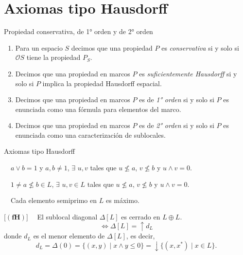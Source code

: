 \documentclass[compress,12pt]{beamer}
\begin{document}
\section{Axiomas tipo Hausdorff}
\begin{frame}{Propiedad conservativa, de 1° orden y de 2° orden}

\begin{definition}
    \begin{enumerate}
        \item Para un espacio $S$ decimos que una propiedad $P$ es \emph{conservativa} si y solo si $\mathcal{O}S$ tiene la propiedad $P_S$.

        \item<2-> Decimos que una propiedad en marcos $P$ es \emph{suficientemente Hausdorff} si y solo si $P$ implica la propiedad Hausdorff espacial.
        
        \item<3-> Decimos que una propiedad en marcos $P$ es de \emph{1° orden} si y solo si $P$ es enunciada como una fórmula para elementos del marco.

        \item<4-> Decimos que una propiedad en marcos $P$ es de \emph{2° orden} si y solo si $P$ es enunciada como una caracterización de sublocales.
    \end{enumerate}
\end{definition}

\end{frame}

\begin{frame}{Axiomas tipo Hausdorff}
    \begin{description}
        \item[$(\mathbf{dH})$] $\quad a\vee b=1$ y $a, b\neq 1$, $\exists$ $u, v$ tales que $u\nleq a$, $v\nleq b$ y $u\wedge v=0$. 
        \item<2->[$(\mathbf{H})$] $\quad 1\neq a\nleq b\in L$, $\exists$ $u, v\in L$ tales que $u\nleq a$, $v\nleq b$ y $u\wedge v=0$. 
        \item<3->[$(\mathbf{Hp})$] $\quad$Cada elemento semiprimo en $L$ es máximo.
        \item<4->{[$(\mathbf{fH})$] $\quad$El sublocal diagonal $\Delta[L]$ es cerrado en $L\oplus L$.
        \[
        \Leftrightarrow \Delta[L]=\uparrow d_L
        \]
        donde $d_L$ es el menor elemento de $\Delta[L]$, es decir,
\[
d_L=\Delta(0)=\{(x, y)\mid x\wedge y\leq 0\}=\downarrow\{(x, x^*)\mid x\in L\}.
\]}
    \end{description}
\end{frame}
\end{document}
